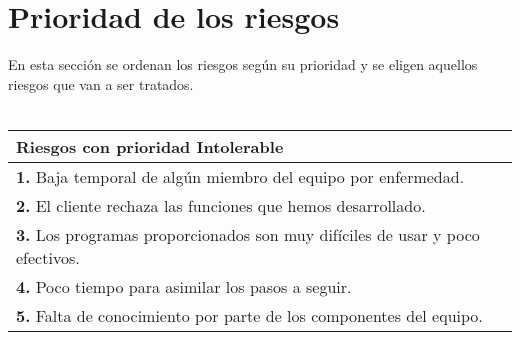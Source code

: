 \documentclass[spanish,a4paper,12pt]{report}	%
\begin{document}
\section{Prioridad de los riesgos}
		En esta sección se ordenan los riesgos según su prioridad y se eligen aquellos riesgos que van a ser tratados.\\ \ \\ 

			\begin{tabular}{|p{12cm}|}
				\hline
				\textbf{Riesgos con prioridad Intolerable}\\ \hline \hline
				\textbf{1.} Baja temporal de algún miembro del equipo por enfermedad.\\ \hline 
				\textbf{2.} El cliente rechaza las funciones que hemos desarrollado.\\ \hline
				\textbf{3.} Los programas proporcionados son muy difíciles de usar y poco efectivos. \\ \hline
				\textbf{4.} Poco tiempo para asimilar los pasos a seguir. \\ \hline
				\textbf{5.} Falta de conocimiento por parte de los componentes del equipo.\\ \hline
			\end{tabular}
			
				\ \\
				\ \\
			
\end{document}
